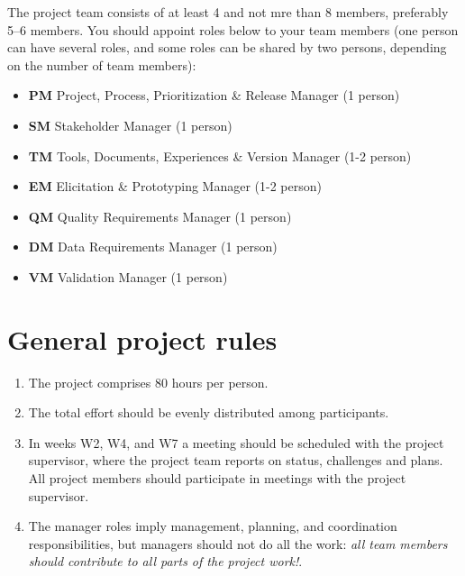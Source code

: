 \documentclass{project}
\begin{document}
The project team consists of at least 4 and not mre than 8 members, preferably 5--6 members. You should appoint roles below to your team members (one person can have several roles, and some roles can be shared by two persons, depending on the number of team members):

\begin{itemize}[noitemsep]
\item \textbf{PM} Project, Process, Prioritization \& Release Manager (1 person)
\item \textbf{SM} Stakeholder Manager (1 person)
\item \textbf{TM} Tools, Documents, Experiences \& Version Manager (1-2 person)
\item \textbf{EM} Elicitation \& Prototyping Manager (1-2 person)
\item \textbf{QM} Quality Requirements Manager (1 person)
\item \textbf{DM} Data Requirements Manager (1 person)
\item \textbf{VM} Validation Manager (1 person)
\end{itemize}

\section{General project rules}
\begin{enumerate}[nolistsep]
\item The project comprises 80 hours per person.
\item The total effort should be evenly distributed among participants.
\item In weeks W2, W4, and W7 a meeting should be scheduled with the project supervisor, where the project team reports on status, challenges and plans. All project members should participate in meetings with the project supervisor.
\item The manager roles imply management, planning, and coordination responsibilities, but managers should not do all the work: {\it all team members should contribute to all parts of the project work!}.
\end{enumerate}
\end{document}
